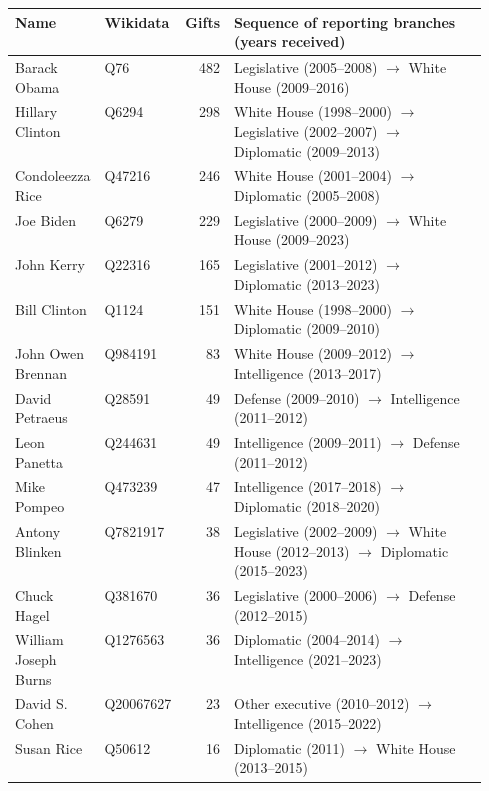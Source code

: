 \begin{tabular}{llrp{0.55\linewidth}}
\toprule
Name & Wikidata & Gifts & Sequence of reporting branches (years received) \\
\midrule
Barack Obama & Q76 & 482 & Legislative (2005--2008) $\rightarrow$ White House (2009--2016) \\
Hillary Clinton & Q6294 & 298 & White House (1998--2000) $\rightarrow$ Legislative (2002--2007) $\rightarrow$ Diplomatic (2009--2013) \\
Condoleezza Rice & Q47216 & 246 & White House (2001--2004) $\rightarrow$ Diplomatic (2005--2008) \\
Joe Biden & Q6279 & 229 & Legislative (2000--2009) $\rightarrow$ White House (2009--2023) \\
John Kerry & Q22316 & 165 & Legislative (2001--2012) $\rightarrow$ Diplomatic (2013--2023) \\
Bill Clinton & Q1124 & 151 & White House (1998--2000) $\rightarrow$ Diplomatic (2009--2010) \\
John Owen Brennan & Q984191 & 83 & White House (2009--2012) $\rightarrow$ Intelligence (2013--2017) \\
David Petraeus & Q28591 & 49 & Defense (2009--2010) $\rightarrow$ Intelligence (2011--2012) \\
Leon Panetta & Q244631 & 49 & Intelligence (2009--2011) $\rightarrow$ Defense (2011--2012) \\
Mike Pompeo & Q473239 & 47 & Intelligence (2017--2018) $\rightarrow$ Diplomatic (2018--2020) \\
Antony Blinken & Q7821917 & 38 & Legislative (2002--2009) $\rightarrow$ White House (2012--2013) $\rightarrow$ Diplomatic (2015--2023) \\
Chuck Hagel & Q381670 & 36 & Legislative (2000--2006) $\rightarrow$ Defense (2012--2015) \\
William Joseph Burns & Q1276563 & 36 & Diplomatic (2004--2014) $\rightarrow$ Intelligence (2021--2023) \\
David S. Cohen & Q20067627 & 23 & Other executive (2010--2012) $\rightarrow$ Intelligence (2015--2022) \\
Susan Rice & Q50612 & 16 & Diplomatic (2011) $\rightarrow$ White House (2013--2015) \\
\bottomrule
\end{tabular}
